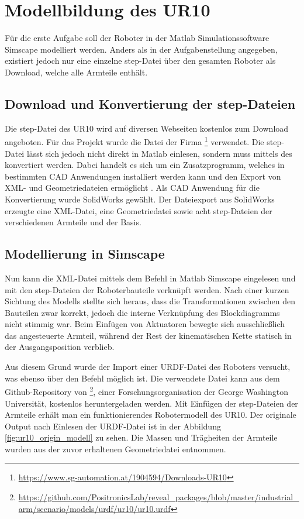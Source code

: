 \section{Modellbildung des UR10}

Für die erste Aufgabe soll der Roboter in der Matlab Simulationssoftware Simscape modelliert werden.
Anders als in der Aufgabenstellung angegeben, existiert jedoch nur eine einzelne step-Datei über den gesamten Roboter als Download, welche alle Armteile enthält.


\subsection{Download und Konvertierung der step-Dateien}
Die step-Datei des UR10 wird auf diversen Webseiten kostenlos zum Download angeboten.
Für das Projekt wurde die Datei der Firma \footnote{\url{https://www.sg-automation.at/1904594/Downloads-UR10}} verwendet.
Die step-Datei lässt sich jedoch nicht direkt in Matlab einlesen, sondern muss mittels des  konvertiert werden.
Dabei handelt es sich um ein Zusatzprogramm, welches in bestimmten CAD Anwendungen installiert werden kann und den Export von XML- und Geometriedateien ermöglicht \cite{sm_plugin}.
Als CAD Anwendung für die Konvertierung wurde SolidWorks gewählt. 
Der Dateiexport aus SolidWorks erzeugte eine XML-Datei, eine Geometriedatei  sowie acht step-Dateien der verschiedenen Armteile und der Basis.


\subsection{Modellierung in Simscape}

Nun kann die XML-Datei mittels dem Befehl  in Matlab Simscape eingelesen und mit den step-Dateien der Roboterbauteile verknüpft werden.
Nach einer kurzen Sichtung des Modells stellte sich heraus, dass die Transformationen zwischen den Bauteilen zwar korrekt, jedoch die interne Verknüpfung des Blockdiagramms nicht stimmig war.
Beim Einfügen von Aktuatoren bewegte sich ausschließlich das angesteuerte Armteil, während der Rest der kinematischen Kette statisch in der Ausgangsposition verblieb. 

Aus diesem Grund wurde der Import einer URDF-Datei des Roboters versucht, was ebenso über den Befehl  möglich ist.
Die verwendete Datei kann aus dem Github-Repository von \footnote{\url{https://github.com/PositronicsLab/reveal_packages/blob/master/industrial_arm/scenario/models/urdf/ur10/ur10.urdf}}, einer Forschungsorganisation der George Washington Universität, kostenlos heruntergeladen werden.
Mit Einfügen der step-Dateien der Armteile erhält man ein funktionierendes Robotermodell des UR10. 
Der originale Output nach Einlesen der URDF-Datei ist in der Abbildung \ref{fig:ur10_origin_modell} zu sehen.
Die Massen und Trägheiten der Armteile wurden aus der zuvor erhaltenen Geometriedatei entnommen.


